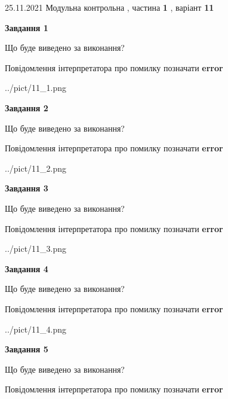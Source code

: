 \documentclass[10pt, ukrainian]{article}
\begin{document}
{25.11.2021 Модульна контрольна , частина \textbf { 1 }, варіант  \No \textbf { 11 }\par}
{
\begin {large}

{\begin {center}\textbf{Завдання 1}\end {center}}\par
Що буде виведено за виконання? \par
Повідомлення інтерпретатора про помилку позначати \textbf{error}

\begin{center}
	{../pict/11_1.png}
\end{center}
\newpage

{\begin {center}\textbf{Завдання 2}\end {center}}\par
Що буде виведено за виконання? \par
Повідомлення інтерпретатора про помилку позначати \textbf{error}

\begin{center}
	{../pict/11_2.png}
\end{center}
\newpage

{\begin {center}\textbf{Завдання 3}\end {center}}\par
Що буде виведено за виконання? \par
Повідомлення інтерпретатора про помилку позначати \textbf{error}

\begin{center}
	{../pict/11_3.png}
\end{center}
\newpage

{\begin {center}\textbf{Завдання 4}\end {center}}\par
Що буде виведено за виконання? \par
Повідомлення інтерпретатора про помилку позначати \textbf{error}

\begin{center}
	{../pict/11_4.png}
\end{center}
\newpage

{\begin {center}\textbf{Завдання 5}\end {center}}\par
Що буде виведено за виконання? \par
Повідомлення інтерпретатора про помилку позначати \textbf{error}


\end{large}}
\end{document}
